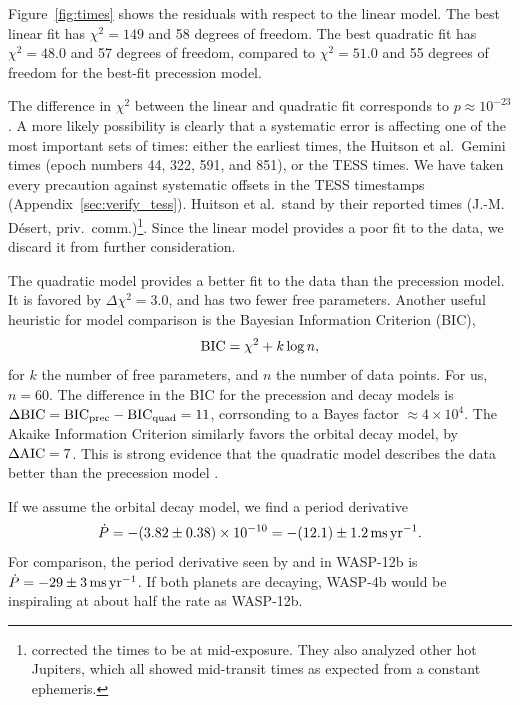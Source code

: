 \documentclass[12pt,twocolumn,tighten]{aastex62}
\begin{document}
Figure~\ref{fig:times} shows the residuals with respect to the linear
model.  The best linear fit has $\chi^2 = 149$ and 58 degrees of
freedom.  The best quadratic fit has $\chi^2 = 48.0$ and 57
degrees of freedom, compared to $\chi^2 = 51.0$
and 55 degrees of freedom for the best-fit precession model.

The difference in $\chi^2$ between the linear and quadratic fit
corresponds to $p \approx 10^{-23}$.  A more likely possibility is
clearly that a systematic error is affecting one of the most important
sets of times: either the earliest times, the Huitson et al.\ Gemini
times (epoch numbers 44, 322, 591, and 851), or the TESS times.  We
have taken every precaution against systematic offsets in the TESS
timestamps (Appendix~\ref{sec:verify_tess}). Huitson et al.\ stand by
their reported times (J.-M. D\'esert, priv.\
comm.)\footnote{\citet{huitson_gemini_2017} corrected the times to be
at mid-exposure. They also analyzed other hot Jupiters, which all
showed mid-transit times as expected from a constant ephemeris.}.
Since the linear model provides a poor fit to the data, we discard it
from further consideration.

The quadratic model provides a better fit to the data than the
precession model.  It is favored by $\Delta \chi^2 = 3.0$, and has two
fewer free parameters.  Another useful heuristic for model comparison
is the Bayesian Information Criterion (BIC),
\begin{equation}
  {\rm BIC} = \chi^2 + k\log n,
\end{equation}
for $k$ the number of free parameters, and $n$ the number of data
points. For us, $n=60$.  The difference in the BIC for the precession
and decay models is $\Delta {\rm BIC} = {\rm BIC}_{\rm prec} - {\rm
BIC}_{\rm quad} = 11$, corrsonding to a Bayes factor $\approx
4\times10^{4}$.  The Akaike Information Criterion similarly favors the
orbital decay model, by $\Delta {\rm AIC} = 7$.  This is strong
evidence that the quadratic model describes the data better than the
precession model \citep{kass_bayes_1995}.

If we assume the orbital decay model, we find a period derivative 
\begin{equation}
\dot{P}
  = - (3.82 \pm 0.38)\times 10^{-10}
  = - (12.1) \pm 1.2\,{\rm ms}\,{\rm yr}^{-1}.
  \label{eq:dP_dt_obs}
\end{equation}
For comparison, the period derivative seen by
\citet{maciejewski_departure_2016} and \citet{patra_2017} in WASP-12b
is $\dot{P} = -29 \pm 3\,{\rm ms}\,{\rm yr}^{-1}$.  If both planets
are decaying, WASP-4b would be inspiraling at about half the rate as
WASP-12b.
\end{document}
